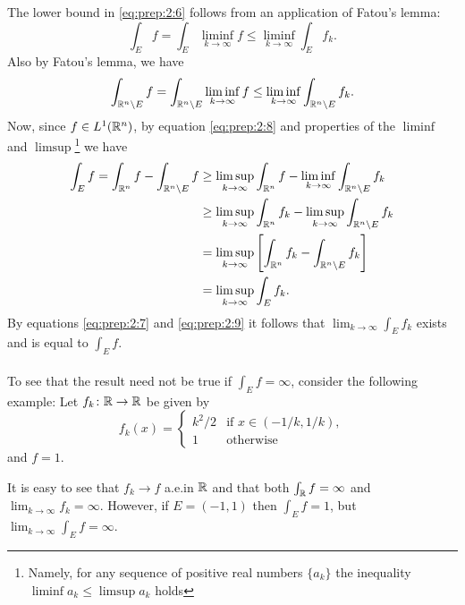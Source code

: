 \begin{solution}
The lower bound in \eqref{eq:prep:2:6} follows from an application of
Fatou's lemma:
\begin{equation}
  \label{eq:prep:2:7}
\int_E f=\int_E\liminf_{k\to\infty} f\leq\liminf_{k\to\infty}\int_E f_k.
\end{equation}
Also by Fatou's lemma, we have
\begin{equation}
  \label{eq:prep:2:8}
\int_{\mathbb{R}^n\setminus E}f=\int_{\mathbb{R}^n\setminus
  E}\liminf_{k\to\infty}f\leq\liminf_{k\to\infty}\int_{\mathbb{R}^n\setminus E}f_k.
\end{equation}
Now, since $f\in L^1(\mathbb{R}^n)$, by equation \eqref{eq:prep:2:8} and
properties of the $\liminf$ and $\limsup$\footnote{Namely, for any sequence
  of positive real numbers $\{a_k\}$ the inequality $\liminf a_k\leq\limsup
  a_k$ holds} we have
\begin{equation}
\label{eq:prep:2:9}
\begin{aligned}
\int_Ef=\int_{\mathbb{R}^n}f-\int_{\mathbb{R}^n\setminus E}f
&\geq\limsup_{k\to\infty}\int_{\mathbb{R}^n}f-\liminf_{k\to\infty}\int_{\mathbb{R}^n\setminus
E}f_k\\
&\geq\limsup_{k\to\infty}\int_{\mathbb{R}^n}f_k-\limsup_{k\to\infty}\int_{\mathbb{R}^n\setminus
  E}f_k\\
&=\limsup_{k\to\infty}\left[\int_{\mathbb{R}^n}f_k-\int_{\mathbb{R}^n\setminus
    E}f_k\right]\\
&=\limsup_{k\to\infty}\int_Ef_k.
\end{aligned}
\end{equation}
By equations \eqref{eq:prep:2:7} and \eqref{eq:prep:2:9} it follows
that $\lim_{k\to\infty}\int_E f_k$ exists and is equal to $\int_E f$.
\\\\
To see that the result need not be true if $\int_Ef=\infty$, consider the
following example: Let $f_k\colon\mathbb{R}\to\mathbb{R}$ be given by
\begin{equation}
\label{eq:prep:2:11}
f_k(x)=
\begin{cases}
k^2/2&\text{if $x\in(-1/k,1/k)$},\\
1&\text{otherwise}
\end{cases}
\end{equation}
and $f=1$.

It is easy to see that $f_k\to f$ a.e.\@ in $\mathbb{R}$ and that both $\int_{\mathbb{R}}
f=\infty$ and $\lim_{k\to\infty}f_k=\infty$. However, if $E=(-1,1)$
then $\int_E f=1$, but $\lim_{k\to\infty}\int_Ef=\infty$.
\end{solution}

